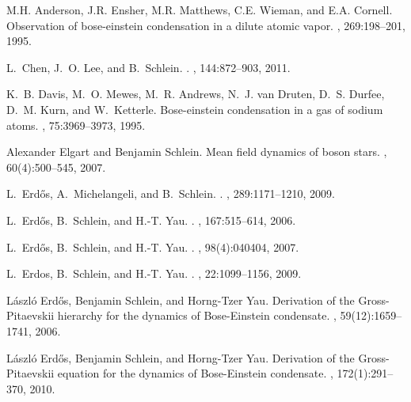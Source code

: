 \documentclass[11pt,a4paper]{article}
\begin{document}
\begin{thebibliography}{10}

M.H. Anderson, J.R. Ensher, M.R. Matthews, C.E. Wieman, and E.A. Cornell.
\newblock Observation of bose-einstein condensation in a dilute atomic vapor.
, 269:198--201, 1995.

L.~{Chen}, J.~O. {Lee}, and B.~{Schlein}.
.
, 144:872--903, 2011.

K.~B. Davis, M.~O. Mewes, M.~R. Andrews, N.~J. van Druten, D.~S. Durfee, D.~M.
  Kurn, and W.~Ketterle.
\newblock Bose-einstein condensation in a gas of sodium atoms.
, 75:3969--3973, 1995.

Alexander Elgart and Benjamin Schlein.
\newblock Mean field dynamics of boson stars.
, 60(4):500--545, 2007.

L.~{Erd{\H o}s}, A.~{Michelangeli}, and B.~{Schlein}.
.
, 289:1171--1210, 2009.

L.~{Erd{\H o}s}, B.~{Schlein}, and H.-T. {Yau}.
.
, 167:515--614, 2006.

L.~{Erd{\H o}s}, B.~{Schlein}, and H.-T. {Yau}.
.
, 98(4):040404, 2007.

L.~{Erdos}, B.~{Schlein}, and H.-T. {Yau}.
.
, 22:1099--1156,
  2009.

L{\'a}szl{\'o} Erd{\H{o}}s, Benjamin Schlein, and Horng-Tzer Yau.
\newblock Derivation of the {G}ross-{P}itaevskii hierarchy for the dynamics of
  {B}ose-{E}instein condensate.
, 59(12):1659--1741, 2006.

L{\'a}szl{\'o} Erd{\H{o}}s, Benjamin Schlein, and Horng-Tzer Yau.
\newblock Derivation of the {G}ross-{P}itaevskii equation for the dynamics of
  {B}ose-{E}instein condensate.
, 172(1):291--370, 2010.


\end{thebibliography}
\end{document}
